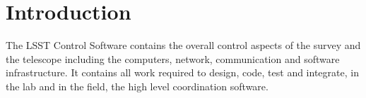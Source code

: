 \section{Introduction} \label{sec:intro}

The LSST Control Software contains the overall control aspects of the survey and the telescope including the computers, network, communication and software infrastructure. It contains all work required to design, code, test and integrate, in the lab and in the field, the high level coordination software.
